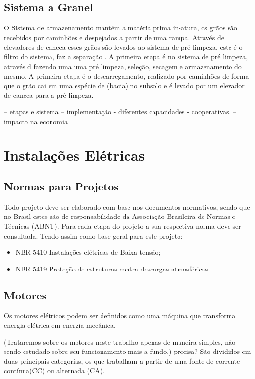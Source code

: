 \subsection{Sistema a Granel}

O Sistema de armazenamento mantém a matéria prima in-atura, os grãos são recebidos por caminhões e despejados a partir de uma rampa. Através de elevadores de caneca esses grãos são levados ao sistema de pré limpeza, este é o filtro do sistema, faz a separação  . A primeira etapa é no sistema de pré limpeza, através d fazendo uma uma pré limpeza, seleção, secagem e armazenamento do mesmo. 
A primeira etapa é o descarregamento, realizado por caminhões de forma que o grão cai em uma espécie de (bacia) no subsolo e é levado por um elevador de caneca para a pré limpeza.  



-- etapas e sistema
-- implementação - diferentes capacidades - cooperativas. 
-- impacto na economia 


\section{Instalações Elétricas}

\subsection{Normas para Projetos}
Todo projeto deve ser elaborado com base nos documentos normativos, sendo que no Brasil estes são de responsabilidade da Associação Brasileira de Normas e Técnicas (ABNT). Para cada etapa do projeto a sua respectiva norma deve ser consultada. Tendo assim como base geral para este projeto:
\begin{itemize}
\item NBR-5410 Instalações elétricas de Baixa tensão;
\item NBR 5419 Proteção de estruturas contra descargas atmosféricas.
\end{itemize}


\subsection{Motores} 

Os motores  elétricos podem ser definidos como uma máquina que transforma energia elétrica em energia mecânica. 

(Trataremos sobre os motores neste trabalho apenas de maneira simples, não sendo estudado  sobre seu funcionamento mais a fundo.) precisa? 
São divididos em duas principais categorias, os que trabalham a partir de uma fonte de corrente contínua(CC) ou  alternada (CA).


